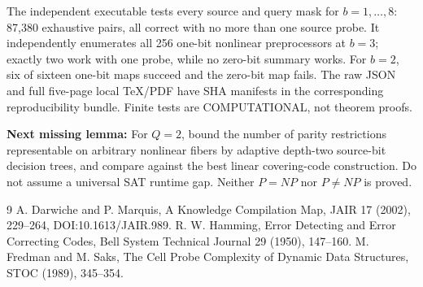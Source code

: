 \documentclass[10pt]{article}
\begin{document}
The independent executable
tests every source and query mask for $b=1,\ldots,8$:
87,380 exhaustive pairs, all correct with no more than one
source probe. It independently enumerates all 256 one-bit
nonlinear preprocessors at $b=3$; exactly two work with one
probe, while no zero-bit summary works. For $b=2$,
six of sixteen one-bit maps succeed and the zero-bit map fails.
The raw JSON and full five-page local TeX/PDF have SHA manifests
in the corresponding reproducibility bundle.
Finite tests are COMPUTATIONAL, not theorem proofs.

\textbf{Next missing lemma:} For $Q=2$, bound the number
of parity restrictions representable on arbitrary nonlinear
fibers by adaptive depth-two source-bit decision trees, and
compare against the best linear covering-code construction.
Do not assume a universal SAT runtime gap.
Neither $P=NP$ nor $P\ne NP$ is proved.
\begin{thebibliography}{9}
 A. Darwiche and P. Marquis, A Knowledge Compilation Map,
JAIR 17 (2002), 229--264, DOI:10.1613/JAIR.989.
 R. W. Hamming, Error Detecting and Error Correcting Codes,
Bell System Technical Journal 29 (1950), 147--160.
 M. Fredman and M. Saks, The Cell Probe Complexity of
Dynamic Data Structures, STOC (1989), 345--354.
\end{thebibliography}
\end{document}
